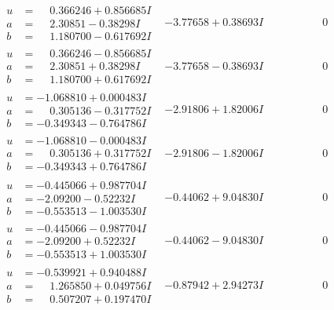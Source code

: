 \documentclass[1p]{elsarticle_modified}
\theoremstyle{definition}
\begin{document}
$$\begin{array}{c|c|c}
\begin{aligned}
u &= \phantom{-}0.366246 + 0.856685 I \\
a &= \phantom{-}2.30851 - 0.38298 I \\
b &= \phantom{-}1.180700 - 0.617692 I\end{aligned}
 & -3.77658 + 0.38693 I & \phantom{-0.000000 } 0 \\ \hline\begin{aligned}
u &= \phantom{-}0.366246 - 0.856685 I \\
a &= \phantom{-}2.30851 + 0.38298 I \\
b &= \phantom{-}1.180700 + 0.617692 I\end{aligned}
 & -3.77658 - 0.38693 I & \phantom{-0.000000 } 0 \\ \hline\begin{aligned}
u &= -1.068810 + 0.000483 I \\
a &= \phantom{-}0.305136 - 0.317752 I \\
b &= -0.349343 - 0.764786 I\end{aligned}
 & -2.91806 + 1.82006 I & \phantom{-0.000000 } 0 \\ \hline\begin{aligned}
u &= -1.068810 - 0.000483 I \\
a &= \phantom{-}0.305136 + 0.317752 I \\
b &= -0.349343 + 0.764786 I\end{aligned}
 & -2.91806 - 1.82006 I & \phantom{-0.000000 } 0 \\ \hline\begin{aligned}
u &= -0.445066 + 0.987704 I \\
a &= -2.09200 - 0.52232 I \\
b &= -0.553513 - 1.003530 I\end{aligned}
 & -0.44062 + 9.04830 I & \phantom{-0.000000 } 0 \\ \hline\begin{aligned}
u &= -0.445066 - 0.987704 I \\
a &= -2.09200 + 0.52232 I \\
b &= -0.553513 + 1.003530 I\end{aligned}
 & -0.44062 - 9.04830 I & \phantom{-0.000000 } 0 \\ \hline\begin{aligned}
u &= -0.539921 + 0.940488 I \\
a &= \phantom{-}1.265850 + 0.049756 I \\
b &= \phantom{-}0.507207 + 0.197470 I\end{aligned}
 & -0.87942 + 2.94273 I & \phantom{-0.000000 } 0 \\ \hline\begin{aligned}

\end{aligned}
\end{array}$$
\end{document}
